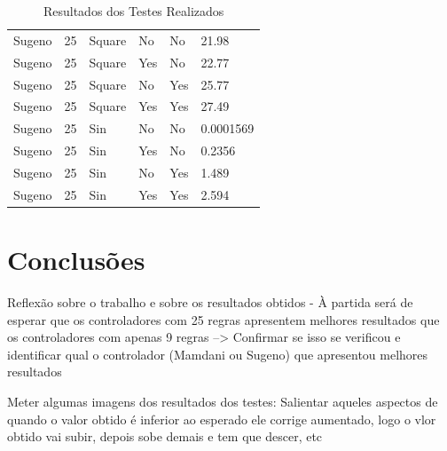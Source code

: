 \documentclass{article}
\begin{document}
\begin{table}[h]
\begin{adjustwidth}{-1cm}{}
\begin{tabular}{|p{1.7cm}|p{2.55cm}|p{3cm}|p{2.5cm}|p{2.5cm}|p{2.2cm}|}
Sugeno              & 25                    & Square                    & No                             & No                           & 21.98                \\
Sugeno              & 25                    & Square                    & Yes                            & No                           & 22.77                \\
Sugeno              & 25                    & Square                    & No                             & Yes                          & 25.77                \\
Sugeno              & 25                    & Square                    & Yes                            & Yes                          & 27.49                \\
Sugeno              & 25                    & Sin                       & No                             & No                           & 0.0001569            \\
Sugeno              & 25                    & Sin                       & Yes                            & No                           & 0.2356               \\
Sugeno              & 25                    & Sin                       & No                             & Yes                          & 1.489                \\
Sugeno              & 25                    & Sin                       & Yes                            & Yes                          & 2.594\\ \hline               
\end{tabular}

\caption{Resultados dos Testes Realizados}
\end{adjustwidth}
\end{table}

\pagebreak

\section{Conclusões}

Reflexão sobre o trabalho e sobre os resultados obtidos - À partida será de esperar que os controladores com 25 regras apresentem melhores resultados que os controladores com apenas 9 regras --> Confirmar se isso se verificou e identificar qual o controlador (Mamdani ou Sugeno) que apresentou melhores resultados

Meter algumas imagens dos resultados dos testes: Salientar aqueles aspectos de quando o valor obtido é inferior ao esperado ele corrige aumentado, logo o vlor obtido vai subir, depois sobe demais e tem que descer, etc
\end{document}
